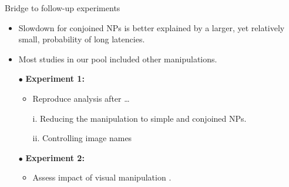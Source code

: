 \begin{frame}{Bridge to follow-up experiments}

\setlength{\leftmargini}{0.5cm}
\setlength{\leftmarginii}{0.5cm}
\begin{itemize}
	\item Slowdown for conjoined NPs is better explained by a larger, yet relatively small, probability of long latencies.
	\item Most studies in our pool included other manipulations.
\end{itemize}
\begin{itemize}
	\item[$\bullet$] \textbf{Experiment 1:} 
	\begin{itemize}
		\item Reproduce analysis after \dots
		\item[i.] Reducing the manipulation to simple and conjoined NPs.
		\item[ii.] Controlling image names
	\end{itemize}
	\item[$\bullet$] \textbf{Experiment 2:} 
	\begin{itemize}
		\item Assess impact of visual manipulation \parencite[as in][]{martin2010planning}.
	\end{itemize}
\end{itemize}

\end{frame}